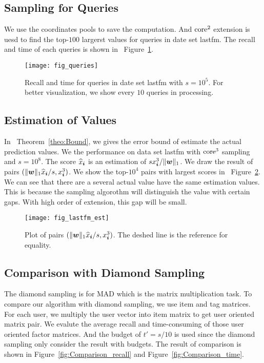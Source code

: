 \documentclass[letterpaper]{article}
\newcommand{\V}[1]{{\bm{{\MakeLowercase{#1}}}}}
\newcommand{\norm}[2]{\|#1\|_{#2}}
\newcommand{\Fig}[1]   {Figure~\ref{fig:#1}}
\newcommand{\Theo}[1] {Theorem~\ref{theo:#1}}
\begin{document}
\subsection{Sampling for Queries}
We use the coordinates pools to save the computation.
And ${\rm core}^2$ extension is uesd 
to find the top-$100$ largerst values for queries in date set lastfm.
The recall and time of each queries is shown in ~\Fig{Queries}.
\begin{figure}[H]
  \centering
  \texttt{[image: fig\_queries]}\\
  \caption{Recall and time for queries in date set lastfm with $s=10^5$.
           For better visualization,
           we show every $10$ queries in processing.}
  \label{fig:Queries}
\end{figure}
\subsection{Estimation of Values}
In ~\Theo{Bound}, we gives the error bound of estimate the actual prediction values.
We the performance on data set lastfm with ${\rm core}^3$ sampling and $s=10^8$.
The score $\widehat{x}_{\V{i}}$ is an estimation of $sx^3_{\V{i}}/\norm{\V{w}}{1}$.
We draw the result of pairs $(\norm{\V{w}}{1}\widehat{x}_{\V{i}}/s,x^3_{\V{i}})$.
We show the top-$10^4$ pairs with largest scores in ~\Fig{Est}.
We can see that there are a several actual value have the same estimation values.
This is because the sampling algorothm will distinguish the value with certain gaps.
With high order of extension, this gap will be small. 
\begin{figure}[H]
  \centering
  \texttt{[image: fig\_lastfm\_est]}\\
  \caption{Plot of pairs $(\norm{\V{w}}{1}\widehat{x}_{\V{i}}/s,x^3_{\V{i}})$.
          The deshed line is the reference for equality.}
  \label{fig:Est}
\end{figure}
\subsection{Comparison with Diamond Sampling}
The diamond sampling is for MAD which is the matrix multiplication task.
To compare our algorithm with diamond sampling, we use item and tag matrices.
For each user, we multiply the user vector into item matrix
to get user oriented matrix pair.
We evalute the average recall and time-consuming of those user oriented factor matrices.
And the budget of $t'=s/10$ is used since the diamond sampling only consider the result with budgets.
The result of comparison is shown in \Fig{Comparison_recall} and \Fig{Comparison_time}.
\end{document}
